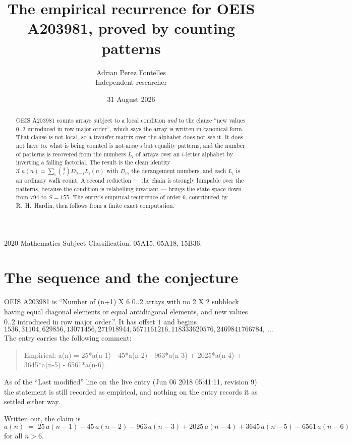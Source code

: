 \documentclass[11pt,a4paper]{article}
\title{The empirical recurrence for OEIS A203981, proved by counting patterns}
\author{Adrian Perez Fontelles\\ \small Independent researcher}
\date{31 August 2026}
\theoremstyle{plain}
\theoremstyle{definition}
\begin{document}
\maketitle

\begin{abstract}
OEIS A203981 counts arrays subject to a local condition \emph{and} to the clause ``new values
$0..2$ introduced in row major order'', which says the array is written in canonical
form. That clause is not local, so a transfer matrix over the alphabet does not see it. It
does not have to: what is being counted is not arrays but equality patterns, and the number
of patterns is recovered from the numbers $L_i$ of arrays over an $i$-letter alphabet by
inverting a falling factorial. The result is the clean identity
$3!\,a(n)=\sum_i\binom{3}{i}D_{3-i}L_i(n)$ with $D_m$ the derangement numbers,
and each $L_i$ is an ordinary walk count. A second reduction --- the chain is strongly
lumpable over the patterns, because the condition is relabelling-invariant --- brings the
state space down from $794$ to $S=155$. The entry's empirical recurrence of order
$6$, contributed by R.~H.~Hardin, then follows from a finite exact computation.
\end{abstract}

\noindent\small 2020 Mathematics Subject Classification. 05A15, 05A18, 15B36.\normalsize

\section{The sequence and the conjecture}

OEIS A203981 is ``Number of (n+1) X 6 0..2 arrays with no 2 X 2 subblock having equal diagonal elements or equal antidiagonal elements, and new values 0..2 introduced in row major order.''. It has offset $1$ and begins
\[
1536, 31104, 629856, 13071456, 271918944, 5671161216, 118333620576, 2469841766784,\ \dots
\]
The entry carries the following comment:
\begin{quote}\small
Empirical: a(n) = 25*a(n-1) - 45*a(n-2) - 963*a(n-3) + 2025*a(n-4) + 3645*a(n-5) - 6561*a(n-6).
\end{quote}
As of the ``Last modified'' line on the live entry (Jun 06 2018 05:41:11, revision 9) the statement is
still recorded as empirical, and nothing on the entry records it as settled either way.

Written out, the claim is
\begin{equation}\label{eq:conj}
a(n)\;=\;25\,a(n-1) - 45\,a(n-2) - 963\,a(n-3) + 2025\,a(n-4) + 3645\,a(n-5) - 6561\,a(n-6)
\end{equation}
for all $n>6$.
\end{document}
